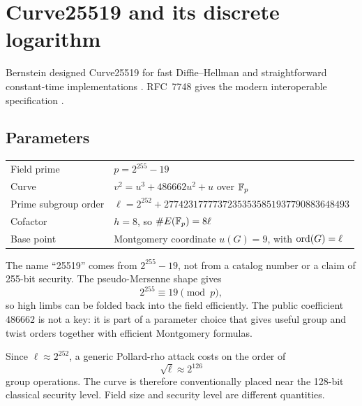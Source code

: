 \section{Curve25519 and its discrete logarithm}

Bernstein designed Curve25519 for fast Diffie--Hellman and straightforward
constant-time implementations \cite{bernstein2006curve25519}. RFC~7748 gives
the modern interoperable specification \cite{rfc7748}.

\subsection{Parameters}

\begin{center}
\begin{tabularx}{\textwidth}{lX}
\toprule
Field prime & $p=2^{255}-19$ \\
Curve & $v^2=u^3+486662u^2+u$ over $\mathbb{F}_p$ \\
Prime subgroup order &
$\ell=2^{252}+27742317777372353535851937790883648493$ \\
Cofactor & $h=8$, so $\#E(\mathbb{F}_p)=8\ell$ \\
Base point & Montgomery coordinate $u(G)=9$, with $\operatorname{ord}(G)=\ell$ \\
\bottomrule
\end{tabularx}
\end{center}

The name ``25519'' comes from $2^{255}-19$, not from a catalog number or a
claim of 255-bit security. The pseudo-Mersenne shape gives
\[
  2^{255}\equiv19\pmod p,
\]
so high limbs can be folded back into the field efficiently. The public
coefficient $486662$ is not a key: it is part of a parameter choice that gives
useful group and twist orders together with efficient Montgomery formulas.

Since $\ell\approx2^{252}$, a generic Pollard-rho attack costs on the order of
\[
  \sqrt\ell\approx2^{126}
\]
group operations. The curve is therefore conventionally placed near the
128-bit classical security level. Field size and security level are different
quantities.

